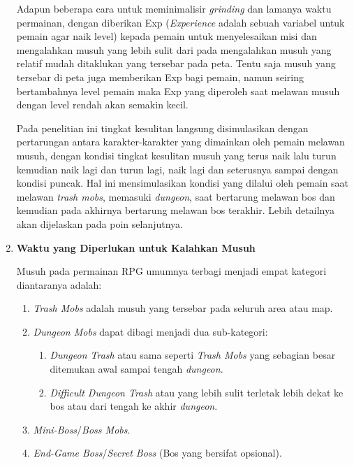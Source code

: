 \begin{enumerate}[label=\textbf{\arabic*).}]
	Adapun beberapa cara untuk meminimalisir \textit{grinding} dan lamanya waktu permainan, dengan diberikan Exp (\textit{Experience} adalah sebuah variabel untuk pemain agar naik level) kepada pemain untuk menyelesaikan misi dan mengalahkan musuh yang lebih sulit dari pada mengalahkan musuh yang relatif mudah ditaklukan yang tersebar pada peta. Tentu saja musuh yang tersebar di peta juga memberikan Exp bagi pemain, namun seiring bertambahnya level pemain maka Exp yang diperoleh saat melawan musuh dengan level rendah akan semakin kecil.
	\vspace{1ex}
	
	Pada penelitian ini tingkat kesulitan langsung disimulasikan dengan pertarungan antara karakter-karakter yang dimainkan oleh pemain melawan musuh, dengan kondisi tingkat kesulitan musuh yang terus naik lalu turun kemudian naik lagi dan turun lagi, naik lagi dan seterusnya sampai dengan kondisi puncak. Hal ini mensimulasikan kondisi yang dilalui oleh pemain saat melawan \textit{trash mobs}, memasuki \textit{dungeon}, saat bertarung melawan bos dan kemudian pada akhirnya bertarung melawan bos terakhir. Lebih detailnya akan dijelaskan pada poin selanjutnya.

	\item \textbf{Waktu yang Diperlukan untuk Kalahkan Musuh}

	Musuh pada permainan RPG umumnya terbagi menjadi empat kategori diantaranya adalah:
	
	\begin{enumerate}[label=\Alph*).]
		\item \textit{Trash Mobs} adalah musuh yang tersebar pada seluruh area atau map.
		\item \textit{Dungeon Mobs} dapat dibagi menjadi dua sub-kategori:
		\begin{enumerate}[label=\alph*).]
			\item \textit{Dungeon Trash} atau sama seperti \textit{Trash Mobs} yang sebagian besar ditemukan awal sampai tengah \textit{dungeon}.
			\item \textit{Difficult Dungeon Trash} atau yang lebih sulit terletak lebih dekat ke bos atau dari tengah ke akhir \textit{dungeon}.
		\end{enumerate}
		\item \textit{Mini-Boss}/\textit{Boss Mobs}.
		\item \textit{End-Game Boss}/\textit{Secret Boss} (Bos yang bersifat opsional).
	\end{enumerate}
	

\end{enumerate}
